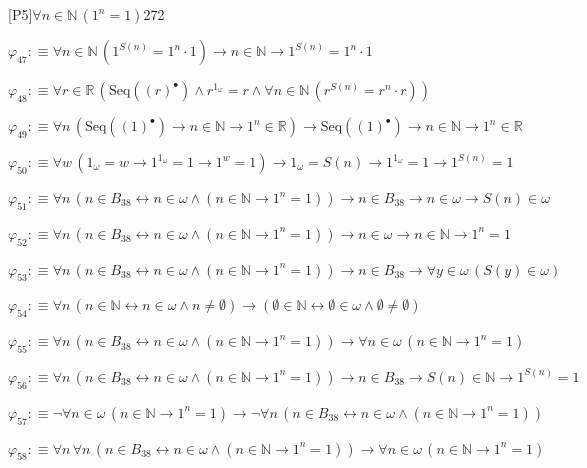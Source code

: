 \begin{fullproof}{[P5]}{$\forall n \in \mathbb{N}\,({{1}^{n}} = 1)$}{272}
\begin{abbrevlist}
\item $\varphi_{47} :\equiv \forall n \in \mathbb{N}\,({{1}^{S(n)}} = {{1}^{n}} \cdot 1) \to n \in \mathbb{N} \to {{1}^{S(n)}} = {{1}^{n}} \cdot 1$
\item $\varphi_{48} :\equiv \forall r \in \mathbb{R}\,(\mathrm{Seq}({(r)^{\bullet}}) \land {{r}^{1_{\omega}}} = r \land \forall n \in \mathbb{N}\,({{r}^{S(n)}} = {{r}^{n}} \cdot r))$
\item $\varphi_{49} :\equiv \forall n\,(\mathrm{Seq}({(1)^{\bullet}}) \to n \in \mathbb{N} \to {{1}^{n}} \in \mathbb{R}) \to \mathrm{Seq}({(1)^{\bullet}}) \to n \in \mathbb{N} \to {{1}^{n}} \in \mathbb{R}$
\item $\varphi_{50} :\equiv \forall w\,(1_{\omega} = w \to {{1}^{1_{\omega}}} = 1 \to {{1}^{w}} = 1) \to 1_{\omega} = S(n) \to {{1}^{1_{\omega}}} = 1 \to {{1}^{S(n)}} = 1$
\item $\varphi_{51} :\equiv \forall n\,(n \in B_{38} \leftrightarrow n \in \omega \land (n \in \mathbb{N} \to {{1}^{n}} = 1)) \to n \in B_{38} \to n \in \omega \to S(n) \in \omega$
\item $\varphi_{52} :\equiv \forall n\,(n \in B_{38} \leftrightarrow n \in \omega \land (n \in \mathbb{N} \to {{1}^{n}} = 1)) \to n \in \omega \to n \in \mathbb{N} \to {{1}^{n}} = 1$
\item $\varphi_{53} :\equiv \forall n\,(n \in B_{38} \leftrightarrow n \in \omega \land (n \in \mathbb{N} \to {{1}^{n}} = 1)) \to n \in B_{38} \to \forall y \in \omega\,(S(y) \in \omega)$
\item $\varphi_{54} :\equiv \forall n\,(n \in \mathbb{N} \leftrightarrow n \in \omega \land n \neq \emptyset) \to (\emptyset \in \mathbb{N} \leftrightarrow \emptyset \in \omega \land \emptyset \neq \emptyset)$
\item $\varphi_{55} :\equiv \forall n\,(n \in B_{38} \leftrightarrow n \in \omega \land (n \in \mathbb{N} \to {{1}^{n}} = 1)) \to \forall n \in \omega\,(n \in \mathbb{N} \to {{1}^{n}} = 1)$
\item $\varphi_{56} :\equiv \forall n\,(n \in B_{38} \leftrightarrow n \in \omega \land (n \in \mathbb{N} \to {{1}^{n}} = 1)) \to n \in B_{38} \to S(n) \in \mathbb{N} \to {{1}^{S(n)}} = 1$
\item $\varphi_{57} :\equiv \neg \forall n \in \omega\,(n \in \mathbb{N} \to {{1}^{n}} = 1) \to \neg \forall n\,(n \in B_{38} \leftrightarrow n \in \omega \land (n \in \mathbb{N} \to {{1}^{n}} = 1))$
\item $\varphi_{58} :\equiv \forall n\,\forall n\,(n \in B_{38} \leftrightarrow n \in \omega \land (n \in \mathbb{N} \to {{1}^{n}} = 1)) \to \forall n \in \omega\,(n \in \mathbb{N} \to {{1}^{n}} = 1)$

\end{abbrevlist}
\end{fullproof}
